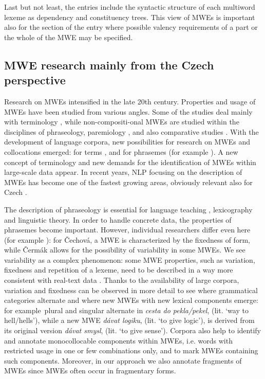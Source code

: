 \documentclass[output=paper,colorlinks,citecolor=brown]{langscibook}
\begin{document}
Last but not least, the entries include the syntactic structure of each multiword lexeme as dependency and constituency trees. This view of MWEs is important also for the section of the entry where possible valency requirements of a part or the whole of the MWE may be specified.



\subsection{MWE research mainly from the Czech perspective}
\label{sec:mwes-research}

Research on MWEs intensified in the late 20th century.
Properties and usage of MWEs have been studied from various angles.
Some of the studies deal mainly with terminology \citep{Bozdechova:2007, Temmerman:2000}, while non-compositi-onal MWEs are studied within the disciplines
of phraseology, paremiology \citep{Cermak:2007}, and also comparative studies \citep[12--16]{Popovicova:2020}. With the development of language corpora, new possibilities for research on MWEs and collocations emerged: for terms \citep{Kovarikova:2017}, and for phrasemes (for example \cite{Colson:2017}). A new concept of terminology \citep{Klegr:2016} and new demands for the identification of MWEs within large-scale data appear. In recent years, NLP focusing on the description of MWEs has become one of the fastest growing areas, obviously relevant also for Czech \citep{Lichte:2019, Sheinfux:2019}.

The description of phraseology is essential for language teaching \citep[66--67]{Cechova:2011}, lexicography \citep{Cermak:2009} and linguistic theory. In order to handle concrete data, the properties of phrasemes become important. However, individual researchers differ even here (for example \cite{Cechova:2011, Cermak:2009}): for Čechová, a MWE is characterized by the fixedness of form, while Čermák allows for the possibility of variability in some MWEs.
We see variability as a complex phenomenon: some MWE properties, such as variation, fixedness and repetition of a lexeme, need to be described in a way more consistent with real-text data \citep{Jelinek:2018}. Thanks to the availability of large  corpora, variation and fixedness can be observed in more detail to see where  grammatical categories alternate and where new MWEs with new lexical components emerge: for example\ plural and singular alternate in \emph{cesta do pekla/pekel}, (lit. `way to hell/hells'), while a new MWE \emph{dávat logiku}, (lit. `to give logic'), is derived from its original version \emph{dávat smysl}, (lit. `to give sense'). Corpora also help to identify and annotate monocollocable components within MWEs, i.e. words with restricted usage in one or few combinations only, and to mark MWEs containing such components.
Moreover, in our approach we also annotate fragments of MWEs since MWEs often occur in fragmentary forms. 
\end{document}

